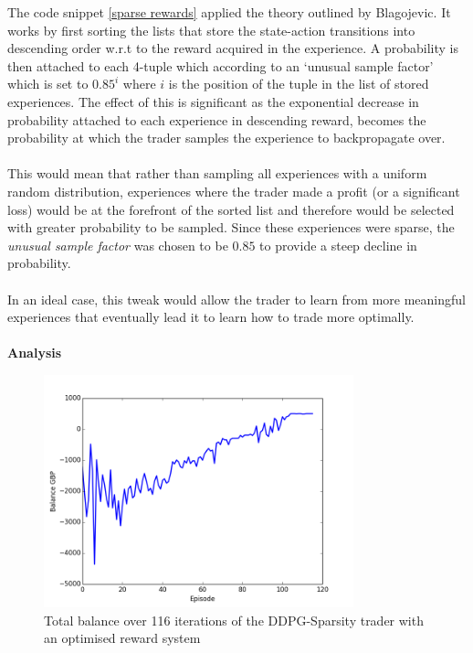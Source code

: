 \documentclass[ %
                    author={Ashwinder Khurana},
                supervisor={Prof Dave Cliff},
                    degree={MEng},
                     title={The Deeply Reinforced Trader},
                  subtitle={},
                      type={enterprise},
                      year={2020} ]{dissertation}
\begin{document}
{\noindent
The code snippet \ref{sparse rewards} applied the theory outlined by Blagojevic. It works by first sorting the lists that store the state-action transitions into descending order w.r.t to the reward acquired in the experience. A probability is then attached to each 4-tuple which according to an \enquote*{unusual sample factor} which is set to $0.85^{i}$ where $i$ is the position of the tuple in the list of stored experiences. The effect of this is significant as the exponential decrease in probability attached to each experience in descending reward, becomes the probability at which the trader samples the experience to backpropagate over.
\\
\\
This would mean that rather than sampling all experiences with a uniform random distribution, experiences where the trader made a profit (or a significant loss) would be at the forefront of the sorted list and therefore would be selected with greater probability to be sampled. Since these experiences were sparse, the \textit{unusual sample factor} was chosen to be $0.85$ to provide a steep decline in probability. 
\\
\\
\noindent
In an ideal case, this tweak would allow the trader to learn from more meaningful experiences that eventually lead it to learn how to trade more optimally.
\\
\\
\textbf{Analysis }
\begin{figure}[H]
	\centering
  	\includegraphics[width=0.8\textwidth]{DDPG-Sparsity-Balance}
  	\caption{Total balance over 116 iterations of the DDPG-Sparsity trader with an optimised reward system }
	\label{fig:DDPG-Balance}  
\end{figure}

}
\end{document}
